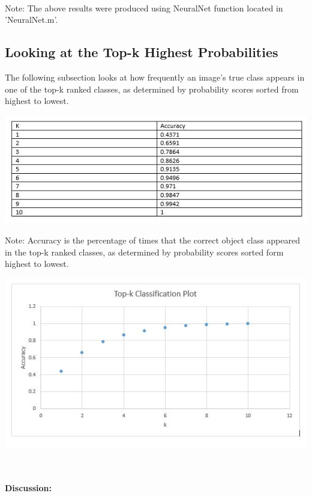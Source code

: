 \documentclass[11pt,english]{article}
\begin{document}
    ~\\
    \noindent
    Note: The above results were produced using NeuralNet function located in 'NeuralNet.m'.

\subsection{Looking at the Top-k Highest Probabilities}
	The following subsection looks at how frequently an image's true class appears in one of the top-k ranked classes, as determined by probability scores sorted from highest to lowest.
\begin{center}
	\includegraphics[scale=0.8]{topktable}

\end{center}
	Note: Accuracy is the percentage of times that the correct object class appeared in the top-k ranked classes, as determined by probability scores sorted form highest to lowest. 
	~\\
\begin{center}
	\includegraphics[scale=0.8]{topkplot}
	~\\~\\
\end{center}
\textbf{Discussion:}
\end{document}
